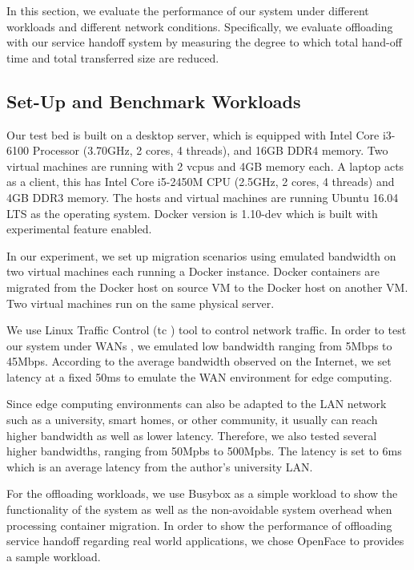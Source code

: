 
In this section, we evaluate the performance of our system under different workloads and different network conditions. 
Specifically, we evaluate offloading with our service handoff system by measuring the degree to which total hand-off time and total transferred size are reduced.

\subsection{Set-Up and Benchmark Workloads}

Our test bed is built on a desktop server, which is equipped with Intel Core i3-6100 Processor (3.70GHz, 2 cores, 4 threads), and 16GB DDR4 memory. Two virtual machines are running with 2 vcpus and 4GB memory each.
A laptop acts as a client, this has Intel Core i5-2450M CPU (2.5GHz, 2 cores, 4 threads) and 4GB DDR3 memory. 
The hosts and virtual machines are running Ubuntu 16.04 LTS as the operating system. Docker version is 1.10-dev which is built with experimental feature enabled.

In our experiment, we set up migration scenarios using 
emulated bandwidth on two virtual machines each running a Docker instance.
Docker containers are migrated from the Docker host on source VM to the Docker host on another VM. 
Two virtual machines run on the same physical server. 

We use Linux Traffic Control (tc\cite{tc} )  tool to control network traffic. In order to test our system under WANs , we emulated low bandwidth ranging from 5Mbps to 45Mbps. According to the average bandwidth observed on the Internet\cite{internet2014state}, we set  latency at a fixed 50ms to emulate the WAN environment for edge computing.

Since edge computing environments can also be adapted to the LAN network such as a university, smart homes, or other community, it usually can reach higher bandwidth as well as lower latency. Therefore, we also tested several higher bandwidths, ranging from 50Mpbs to 500Mpbs. The latency is set to 6ms which is an average latency from the author's university LAN.

For the offloading workloads, we use Busybox as a simple workload to show the functionality of the system as well as the non-avoidable system overhead when processing container migration. In order to show the performance of offloading service handoff regarding real world applications, we chose OpenFace to provides a sample workload.

